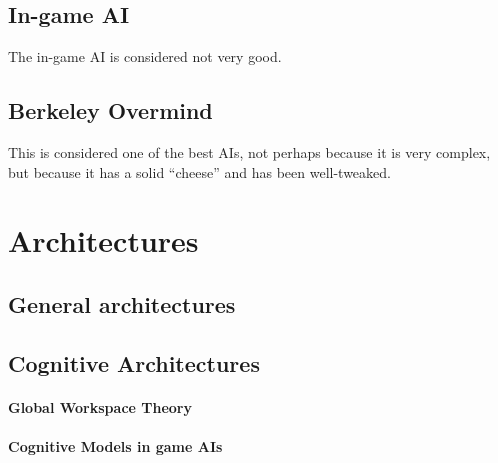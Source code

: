 \subsection{In-game AI}
The in-game AI is considered not very good.

\subsection{Berkeley Overmind}
This is considered one of the best AIs, not perhaps because it is very complex,
but because it has a solid ``cheese'' and has been well-tweaked.


\section{Architectures}
\subsection{General architectures}
\subsubsection{}
\subsection{Cognitive Architectures}
\paragraph{Global Workspace Theory}
\paragraph{Cognitive Models in game AIs}
\cite{Arrabales2009}
